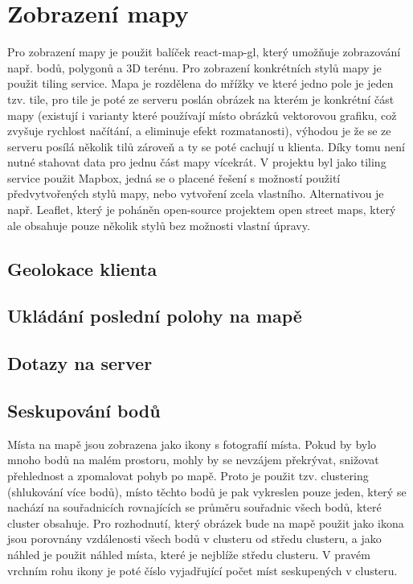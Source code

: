 \documentclass[12pt, a4paper,
 twoside,        %
 openright
]{report}
\begin{document}
\section{Zobrazení mapy}
    Pro zobrazení mapy je použit balíček react-map-gl, který umožňuje zobrazování např. bodů, polygonů a 3D terénu. Pro zobrazení konkrétních stylů mapy je použit tiling service. Mapa je rozdělena do mřížky ve které jedno pole je jeden tzv. tile, pro tile je poté ze serveru poslán obrázek na kterém je konkrétní část mapy (existují i varianty které používají místo obrázků vektorovou grafiku, což zvyšuje rychlost načítání, a eliminuje efekt rozmatanosti), výhodou je že se ze serveru posílá několik tilů zároveň a ty se poté cachují u klienta. Díky tomu není nutné stahovat data pro jednu část mapy vícekrát. V projektu byl jako tiling service použit Mapbox, jedná se o placené řešení s možností použití předvytvořených stylů mapy, nebo vytvoření zcela vlastního. Alternativou je např. Leaflet, který je poháněn open-source projektem open street maps, který ale obsahuje pouze několik stylů bez možnosti vlastní úpravy.
    \subsection{Geolokace klienta}
    \subsection{Ukládání poslední polohy na mapě}
    \subsection{Dotazy na server}
    \subsection{Seskupování bodů}
    Místa na mapě jsou zobrazena jako ikony s fotografií místa. Pokud by bylo mnoho bodů na malém prostoru, mohly by se nevzájem překrývat, snižovat přehlednost a zpomalovat pohyb po mapě. Proto je použit tzv. clustering (shlukování více bodů), místo těchto bodů je pak vykreslen pouze jeden, který se nachází na souřadnicích rovnajících se průměru souřadnic všech bodů, které cluster obsahuje. Pro rozhodnutí, který obrázek bude na mapě použit jako ikona jsou porovnány vzdálenosti všech bodů v clusteru od středu clusteru, a jako náhled je použit náhled místa, které je nejblíže středu clusteru. V pravém vrchním rohu ikony je poté číslo vyjadřující počet míst seskupených v clusteru.
\end{document}
